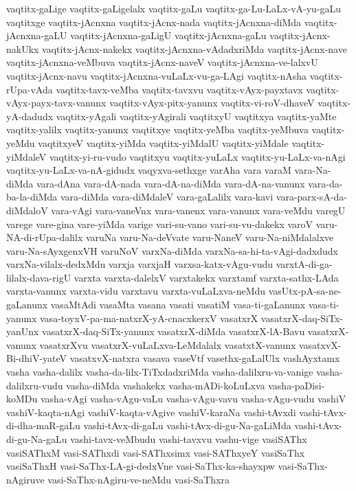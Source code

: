{vaqtitx-gaLige
vaqtitx-gaLigelalx
vaqtitx-gaLu
vaqtitx-ga-Lu-LaLx-vA-yu-gaLu
vaqtitxge
vaqtitx-jAcnxna
vaqtitx-jAcnx-nada
vaqtitx-jAcnxna-diMda
vaqtitx-jAcnxna-gaLU
vaqtitx-jAcnxna-gaLigU
vaqtitx-jAcnxna-gaLu
vaqtitx-jAcnx-nakUkx
vaqtitx-jAcnx-nakekx
vaqtitx-jAcnxna-vAdadxriMda
vaqtitx-jAcnx-nave
vaqtitx-jAcnxna-veMbuva
vaqtitx-jAcnx-naveV
vaqtitx-jAcnxna-ve-lalxvU
vaqtitx-jAcnx-navu
vaqtitx-jAcnxna-vuLaLx-vu-ga-LAgi
vaqtitx-nAsha
vaqtitx-rUpa-vAda
vaqtitx-tavx-veMba
vaqtitx-tavxvu
vaqtitx-vAyx-payxtavx
vaqtitx-vAyx-payx-tavx-vanunx
vaqtitx-vAyx-pitx-yanunx
vaqtitx-vi-roV-dhaveV
vaqtitx-yA-dadudx
vaqtitx-yAgali
vaqtitx-yAgirali
vaqtitxyU
vaqtitxya
vaqtitx-yaMte
vaqtitx-yalilx
vaqtitx-yanunx
vaqtitxye
vaqtitx-yeMba
vaqtitx-yeMbuva
vaqtitx-yeMdu
vaqtitxyeV
vaqtitx-yiMda
vaqtitx-yiMdalU
vaqtitx-yiMdale
vaqtitx-yiMdaleV
vaqtitx-yi-ru-vudo
vaqtitxyu
vaqtitx-yuLaLx
vaqtitx-yu-LaLx-va-nAgi
vaqtitx-yu-LaLx-va-nA-gidudx
vaqyxva-sethxge
varAha
vara
varaM
vara-Na-diMda
vara-dAna
vara-dA-nada
vara-dA-na-diMda
vara-dA-na-vanunx
vara-da-ba-la-diMda
vara-diMda
vara-diMdaleV
vara-gaLalilx
vara-kavi
vara-parx-sA-da-diMdaloV
vara-vAgi
vara-vaneVnx
vara-vanenx
vara-vanunx
vara-veMdu
varegU
varege
vare-gina
vare-yiMda
varige
vari-su-vano
vari-su-vu-dakekx
varoV
varu-NA-di-rUpa-dalilx
varuNa
varu-Na-deVvate
varu-NaneV
varu-Na-niMdalalxve
varu-Na-sAyxgenxVH
varuNoV
varxNa-diMda
varxNa-sa-hi-ta-vAgi-dadxdudx
varxNa-vilalx-dedxMdu
varxja
varxjaH
varxsa-katx-vAgu-vudu
varxtA-di-ga-lilalx-dava-rigU
varxta
varxta-dalelxV
varxtakekx
varxtamf
varxta-sathx-LAda
varxta-vanunx
varxta-vidu
varxtavu
varxta-vuLaLxva-neMdu
vasUtx-pA-sa-ne-gaLanunx
vasaMtAdi
vasaMta
vasana
vasati
vasatiM
vasa-ti-gaLanunx
vasa-ti-yanunx
vasa-toyxV-pa-ma-natxrX-yA-cnacxkerxV
vasatxrX
vasatxrX-daq-SiTx-yanUnx
vasatxrX-daq-SiTx-yanunx
vasatxrX-diMda
vasatxrX-lA-Bavu
vasatxrX-vanunx
vasatxrXvu
vasatxrX-vuLaLxva-LeMdalalx
vasatxtX-vanunx
vasatxvX-Bi-dhiV-yateV
vasatxvX-natxra
vasava
vaseVtf
vasethx-gaLalUlx
vashAyxtamx
vasha
vasha-dalilx
vasha-da-lilx-TiTxdadxriMda
vasha-dalilxru-va-vanige
vasha-dalilxru-vudu
vasha-diMda
vashakekx
vasha-mADi-koLuLxva
vasha-paDisi-koMDu
vasha-vAgi
vasha-vAgu-vaLu
vasha-vAgu-vavu
vasha-vAgu-vudu
vashiV
vashiV-kaqta-nAgi
vashiV-kaqta-vAgive
vashiV-karaNa
vashi-tAvxdi
vashi-tAvx-di-dha-maR-gaLu
vashi-tAvx-di-gaLu
vashi-tAvx-di-gu-Na-gaLiMda
vashi-tAvx-di-gu-Na-gaLu
vashi-tavx-veMbudu
vashi-tavxvu
vashu-vige
vasiSAThx
vasiSAThxM
vasi-SAThxdi
vasi-SAThxsimx
vasi-SAThxyeY
vasiSaThx
vasiSaThxH
vasi-SaThx-LA-gi-dedxVne
vasi-SaThx-ka-shayxpw
vasi-SaThx-nAgiruve
vasi-SaThx-nAgiru-ve-neMdu
vasi-SaThxra
}
